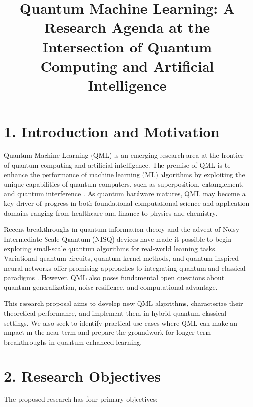 \documentclass[11pt]{article}
\title{\textbf{Quantum Machine Learning: A Research Agenda at the Intersection of Quantum Computing and Artificial Intelligence}}
\author{}
\date{}
\begin{document}
\maketitle

\section*{1. Introduction and Motivation}

Quantum Machine Learning (QML) is an emerging research area at the frontier of quantum computing and artificial intelligence. The premise of QML is to enhance the performance of machine learning (ML) algorithms by exploiting the unique capabilities of quantum computers, such as superposition, entanglement, and quantum interference \cite{biamonte2017}. As quantum hardware matures, QML may become a key driver of progress in both foundational computational science and application domains ranging from healthcare and finance to physics and chemistry.

Recent breakthroughs in quantum information theory and the advent of Noisy Intermediate-Scale Quantum (NISQ) devices have made it possible to begin exploring small-scale quantum algorithms for real-world learning tasks. Variational quantum circuits, quantum kernel methods, and quantum-inspired neural networks offer promising approaches to integrating quantum and classical paradigms \cite{schuld2015, cerezo2021}. However, QML also poses fundamental open questions about quantum generalization, noise resilience, and computational advantage.

This research proposal aims to develop new QML algorithms, characterize their theoretical performance, and implement them in hybrid quantum-classical settings. We also seek to identify practical use cases where QML can make an impact in the near term and prepare the groundwork for longer-term breakthroughs in quantum-enhanced learning.

\section*{2. Research Objectives}

The proposed research has four primary objectives:
\end{document}
